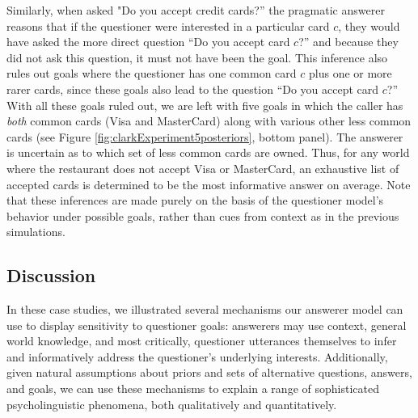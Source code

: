 \documentclass[12pt, floatsintext, jou]{apa6}
\begin{document}
Similarly, when asked "Do you accept credit cards?'' the pragmatic answerer reasons that if the questioner were interested in a particular card $c$, they would have asked the more direct question ``Do you accept card $c$?'' and because they did not ask this question, it must not have been the goal. This inference also rules out goals where the questioner has one common card $c$ plus one or more rarer cards, since these goals also lead to the question ``Do you accept card $c$?'' With all these goals ruled out, we are left with five goals in which the caller has \emph{both} common cards (Visa and MasterCard) along with various other less common cards (see Figure \ref{fig:clarkExperiment5posteriors}, bottom panel). The answerer is uncertain as to which set of less common cards are owned. Thus, for any world where the restaurant does not accept Visa or MasterCard, an exhaustive list of accepted cards is determined to be the most informative answer on average. Note that these inferences are made purely on the basis of the questioner model's behavior under possible goals, rather than cues from context as in the previous simulations.

\subsection{Discussion}

In these case studies, we illustrated several mechanisms our answerer model can use to display sensitivity to questioner goals: answerers may use context, general world knowledge, and most critically, questioner utterances themselves to infer and informatively address the questioner's underlying interests. Additionally, given natural assumptions about priors and sets of alternative questions, answers, and goals, we can use these mechanisms to explain a range of sophisticated psycholinguistic phenomena, both qualitatively and quantitatively.

\end{document}
